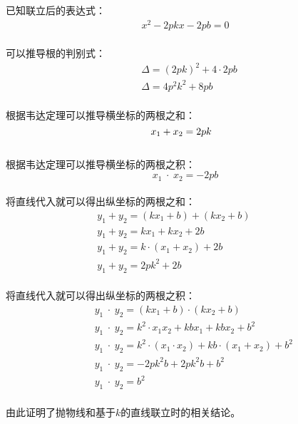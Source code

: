 \documentclass[UTF8]{ctexart}
\begin{document}
    已知联立后的表达式：
    \begin{align}
        x^2-2pkx-2pb=0
    \end{align}\\
    可以推导根的判别式：
    \begin{align}
        &\Delta=(2pk)^2+4\cdot 2pb\\[3mm]
        &\Delta=4p^2k^2+8pb
    \end{align}\\
    根据韦达定理可以推导横坐标的两根之和：
    \begin{equation}
        x_1+x_2=2pk\hphantom{-}
    \end{equation}\\
    根据韦达定理可以推导横坐标的两根之积：
    \begin{equation}
        x_1\hspace{3pt}\cdot\hspace{3pt}x_2=-2pb
    \end{equation}\\
    将直线代入就可以得出纵坐标的两根之和：\vspace{3pt}
    \begin{align}
        &y_1+y_2=(kx_1+b)+(kx_2+b)~~~~~~~~~~~~~~\\[3mm]
        &y_1+y_2=kx_1+kx_2+2b\\[3mm]
        &y_1+y_2=k\cdot(x_1+x_2)+2b\\[3mm]
        &y_1+y_2=2pk^2+2b
    \end{align}\\
    将直线代入就可以得出纵坐标的两根之积：\vspace{3pt}
    \begin{align}
        &~~~~y_1\hspace{3pt}\cdot\hspace{3pt}y_2=(kx_1+b)\cdot(kx_2+b)\\[3mm]
        &~~~~y_1\hspace{3pt}\cdot\hspace{3pt}y_2=k^2\cdot x_1x_2+kbx_1+kbx_2+b^2\\[3mm]
        &~~~~y_1\hspace{3pt}\cdot\hspace{3pt}y_2=k^2\cdot(x_1\cdot x_2)+kb\cdot(x_1+x_2)+b^2\\[3mm]
        &~~~~y_1\hspace{3pt}\cdot\hspace{3pt}y_2=-2pk^2b+2pk^2b+b^2\\[3mm]
        &~~~~y_1\hspace{3pt}\cdot\hspace{3pt}y_2=b^2
    \end{align}\\
    由此证明了抛物线和基于$k$的直线联立时的相关结论。
\end{document}
